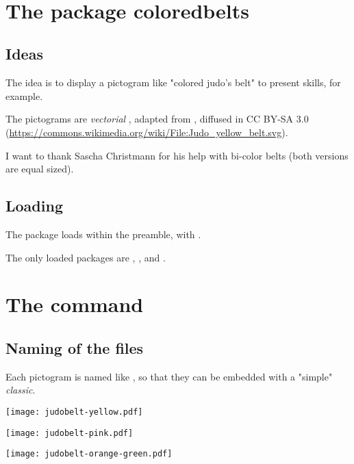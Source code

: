 \documentclass[english,11pt,a4paper]{article}
\begin{document}
\vfill~

\pagebreak

\section{The package coloredbelts}

\subsection{Ideas}

The idea is to display a pictogram like "colored judo's belt" to present skills, for example.

\medskip

The pictograms are \textit{vectorial} , adapted from , diffused in CC BY-SA 3.0 (\url{https://commons.wikimedia.org/wiki/File:Judo_yellow_belt.svg}).

\medskip

I want to thank Sascha Christmann for his help with bi-color belts (both versions are equal sized).

\subsection{Loading}

The package loads within the preamble, with .

The only loaded packages are , ,  and .

\begin{codehigh}[language=latex/latex2,style/main=cyan!10,style/code=cyan!10]
\usepackage{coloredbelts}
\end{codehigh}

\section{The command}

\subsection{Naming of the files}

Each pictogram is named like , so that they can be embedded with a "simple"  \textit{classic}.

\begin{demohigh}[language=latex/latex3,style/main=cyan!10,style/code=cyan!10,style/demo=cyan!10]
\texttt{[image: judobelt-yellow.pdf]}\par
\texttt{[image: judobelt-pink.pdf]}\par
\texttt{[image: judobelt-orange-green.pdf]}
\end{demohigh}
\end{document}
